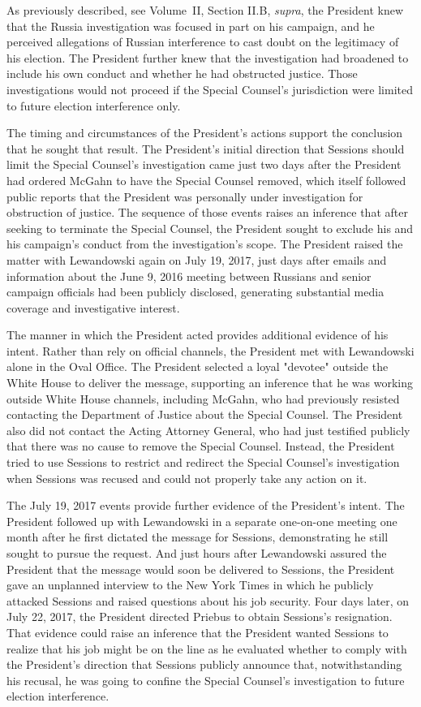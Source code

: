 {As previously described, see Volume~II, Section II.B, \textit{supra}, the President knew that the Russia investigation was focused in part on his campaign, and he perceived allegations of Russian interference to cast doubt on the legitimacy of his election.
The President further knew that the investigation had broadened to include his own conduct and whether he had obstructed justice.
Those investigations would not proceed if the Special Counsel's jurisdiction were limited to future election interference only.

The timing and circumstances of the President's actions support the conclusion that he sought that result.
The President's initial direction that Sessions should limit the Special Counsel's investigation came just two days after the President had ordered McGahn to have the Special Counsel removed, which itself followed public reports that the President was personally under investigation for obstruction of justice.
The sequence of those events raises an inference that after seeking to terminate the Special Counsel, the President sought to exclude his and his campaign's conduct from the investigation's scope.
The President raised the matter with Lewandowski again on July 19, 2017, just days after emails and information about the June 9, 2016 meeting between Russians and senior campaign officials had been publicly disclosed, generating substantial media coverage and investigative interest.

The manner in which the President acted provides additional evidence of his intent.
Rather than rely on official channels, the President met with Lewandowski alone in the Oval Office.
The President selected a loyal "devotee" outside the White House to deliver the message, supporting an inference that he was working outside White House channels, including McGahn, who had previously resisted contacting the Department of Justice about the Special Counsel.
The President also did not contact the Acting Attorney General, who had just testified publicly that there was no cause to remove the Special Counsel.
Instead, the President tried to use Sessions to restrict and redirect the Special Counsel's investigation when Sessions was recused and could not properly take any action on it.

The July 19, 2017 events provide further evidence of the President's intent.
The President followed up with Lewandowski in a separate one-on-one meeting one month after he first dictated the message for Sessions, demonstrating he still sought to pursue the request.
And just hours after Lewandowski assured the President that the message would soon be delivered to Sessions, the President gave an unplanned interview to the New York Times in which he publicly attacked Sessions and raised questions about his job security.
Four days later, on July 22, 2017, the President directed Priebus to obtain Sessions's resignation.
That evidence could raise an inference that the President wanted Sessions to realize that his job might be on the line as he evaluated whether to comply with the President's direction that Sessions publicly announce that, notwithstanding his recusal, he was going to confine the Special Counsel's investigation to future election interference.

}

